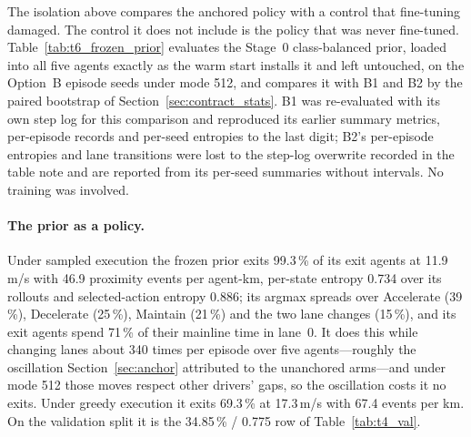 The isolation above compares the anchored policy with a control that fine-tuning damaged. The control it does not include is the policy that was never fine-tuned. Table~\ref{tab:t6_frozen_prior} evaluates the Stage~0 class-balanced prior, loaded into all five agents exactly as the warm start installs it and left untouched, on the Option~B episode seeds under mode 512, and compares it with B1 and B2 by the paired bootstrap of Section~\ref{sec:contract_stats}. B1 was re-evaluated with its own step log for this comparison and reproduced its earlier summary metrics, per-episode records and per-seed entropies to the last digit; B2's per-episode entropies and lane transitions were lost to the step-log overwrite recorded in the table note and are reported from its per-seed summaries without intervals. No training was involved.

\paragraph{The prior as a policy.}
Under sampled execution the frozen prior exits 99.3\,\% of its exit agents at 11.9\,m/s with 46.9 proximity events per agent-km, per-state entropy 0.734 over its rollouts and selected-action entropy 0.886; its argmax spreads over Accelerate (39\,\%), Decelerate (25\,\%), Maintain (21\,\%) and the two lane changes (15\,\%), and its exit agents spend 71\,\% of their mainline time in lane~0. It does this while changing lanes about 340 times per episode over five agents---roughly the oscillation Section~\ref{sec:anchor} attributed to the unanchored arms---and under mode 512 those moves respect other drivers' gaps, so the oscillation costs it no exits. Under greedy execution it exits 69.3\,\% at 17.3\,m/s with 67.4 events per km. On the validation split it is the 34.85\,\% / 0.775 row of Table~\ref{tab:t4_val}.

